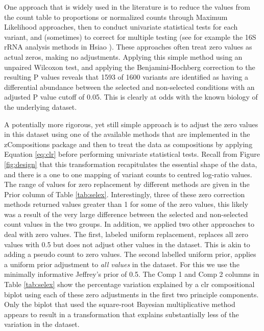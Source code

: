\documentclass[article]{ajs}\usepackage[]{graphicx}\usepackage[]{color}
\begin{document}
One approach that is widely used in the literature is to reduce the values from the count table to proportions or normalized counts through Maximum Likelihood approaches, then to conduct univariate statistical tests for each variant, and (sometimes) to correct for multiple testing (see for example the 16S rRNA analysis methods in Hsiao \citeyear{Hsiao:2013}). These approaches often treat zero values as actual zeros,  making no adjustments. Applying this simple method using an unpaired Wilcoxon test, and applying the Benjamini-Hochberg correction \citep{benjamini:1995} to the resulting P values reveals that 1593 of 1600 variants are identified as having a differential abundance between the selected and non-selected conditions with an adjusted P value cutoff of 0.05. This is clearly at odds with the known biology of the underlying dataset. 

A potentially more rigorous, yet still simple approach is to adjust the zero values in this dataset using one of the available methods that are implemented in the zCompositions  package \citep{PalareaAlbaladejo201585} and then to treat the data as compositions by applying Equation \ref{eq:clr} before performing univariate statistical tests. Recall from Figure \ref{fig:design} that this transformation recapitulates the essential shape of the data, and there is a one to one mapping of variant counts to centred log-ratio values. The range of values for zero replacement by different methods are given in the Prior column of Table \ref{tab:selex}. Interestingly, three of these zero correction methods returned values greater than 1 for some of the zero values, this likely was a result of the very large difference between the selected and non-selected count values in the two groups. In addition, we applied two other approaches to deal with zero values. The first, labeled uniform replacement, replaces all zero values with 0.5 but does not adjust other values in the dataset. This is akin to adding a pseudo count to zero values. The second labelled uniform prior, applies a uniform prior adjustment to \emph{all values} in the  dataset. For this we use the minimally informative Jeffrey's prior of 0.5. The Comp 1 and Comp 2 columns in Table \ref{tab:selex} show the percentage variation explained by a clr compositional biplot using each of these zero adjustments in the first two principle components. Only the biplot that used the square-root Bayesian multiplicative  method appears to result in a transformation that explains substantially less of the variation in the dataset. 
\end{document}

